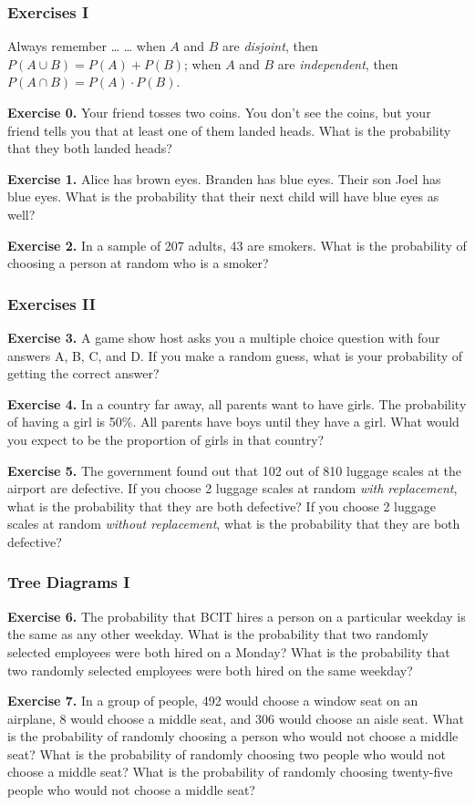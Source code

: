 \documentclass[xcolor=dvipsnames]{beamer}
\begin{document}
\begin{frame}
  \frametitle{Exercises I}
  \begin{block}{Always remember {\ldots}}
  {\ldots} when $A$ and $B$ are \emph{disjoint}, then
  $P(A\cup{}B)=P(A)+P(B)$; when $A$ and $B$ are \emph{independent},
  then $P(A\cap{}B)=P(A)\cdot{}P(B)$.
  \end{block}
\textbf{Exercise 0.} Your friend tosses two coins. You don't see the
coins, but your friend tells you that at least one of them landed
heads. What is the probability that they both landed heads?

\textbf{Exercise 1.} Alice has brown eyes. Branden has blue eyes. Their son
Joel has blue eyes. What is the probability that their next child will
have blue eyes as well?

\textbf{Exercise 2.} In a sample of 207 adults, 43 are smokers. What
is the probability of choosing a person at random who is a smoker?
\end{frame}

\begin{frame}
  \frametitle{Exercises II}
\textbf{Exercise 3.} A game show host asks you a multiple choice
question with four answers A, B, C, and D. If you make a random guess,
what is your probability of getting the correct answer?

\textbf{Exercise 4.} In a country far away, all parents want to have
girls. The probability of having a girl is 50\%. All parents have boys
until they have a girl. What would you expect to be the proportion of
girls in that country?

\textbf{Exercise 5.} The government found out that 102 out of 810
luggage scales at the airport are defective. If you choose 2 luggage
scales at random \emph{with replacement}, what is the probability that
they are both defective? If you choose 2 luggage scales at random
\emph{without replacement}, what is the probability that they are both
defective?
\end{frame}

\begin{frame}
  \frametitle{Tree Diagrams I}
\textbf{Exercise 6.} The probability that BCIT hires a person on a
particular weekday is the same as any other weekday. What is the
probability that two randomly selected employees were both hired on a
Monday? What is the probability that two randomly selected employees
were both hired on the same weekday?

\textbf{Exercise 7.} In a group of people, 492 would choose a window
seat on an airplane, 8 would choose a middle seat, and 306 would
choose an aisle seat. What is the probability of randomly choosing a
person who would not choose a middle seat? What is the probability of
randomly choosing two people who would not choose a middle seat? What
is the probability of randomly choosing twenty-five people who would
not choose a middle seat?
\end{frame}
\end{document}

